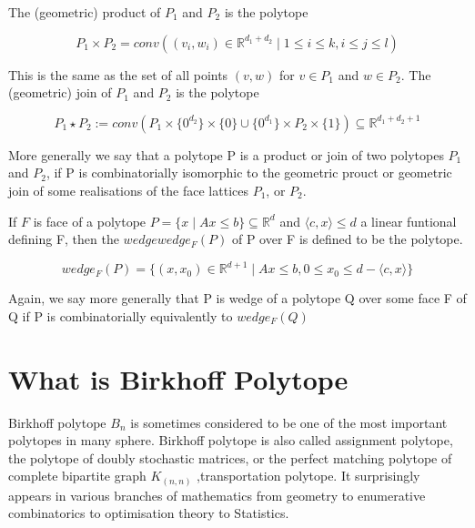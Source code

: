 The (geometric) product of $P_1$ and $P_2$ is the polytope

\begin{equation}
P_1 \times P_2 = conv( (v_i,w_i)\in \mathbb{R}^{d_1+d_2}\mid 1\leq i \leq k, i \leq j \leq l)
\label{eqn:Einstein}
\end{equation}

This is the same as the set of all points $(v,w)$ for $v \in P_1$ and $w \in P_2$. The (geometric) join of $P_1$ and $P_2$ is the polytope

\begin{equation}
P_1 \star P_2 := conv(P_1 \times \{ 0^{d_2} \} \times \{ 0 \} \cup \{ 0^{d_1} \} \times P_2 \times \{ 1 \} ) \subseteq \mathbb{R}^{d_1+d_2+1}
\label{eqn:Einstein}
\end{equation}

More generally we say that a polytope P is a product or join of two polytopes $P_1$ and $P_2$, if P is combinatorially isomorphic to the geometric prouct or geometric join of some realisations of the face lattices $P_1$, or $P_2$.

If $F$ is face of a polytope  $P = \{ x \mid Ax \leq b \} \subseteq \mathbb{R}^d$  and $ \langle c,x \rangle \leq d $ a linear funtional defining F, then the $wedge wedge_F(P)$ of P over F is defined to be the polytope.
 
\begin{equation}
wedge_F(P) = \{ (x,x_0) \in \mathbb{R}^{d+1} \mid Ax\leq b, 0\leq x_0 \leq d- \langle c,x \rangle\}
\label{eqn:Einstein}
\end{equation}

Again, we say more generally that P is wedge of a polytope  Q over some face F of Q if P is combinatorially equivalently to $wedge_F(Q)$




\section{What is Birkhoff Polytope}

Birkhoff polytope $B_n$ is sometimes considered to be one of the most important polytopes in many sphere. Birkhoff polytope is also called assignment polytope, the polytope of doubly stochastic matrices, or the perfect matching polytope of complete bipartite graph $K_(n,n)$ ,transportation polytope. It surprisingly appears in various branches of mathematics from geometry to enumerative combinatorics to optimisation theory to Statistics.

